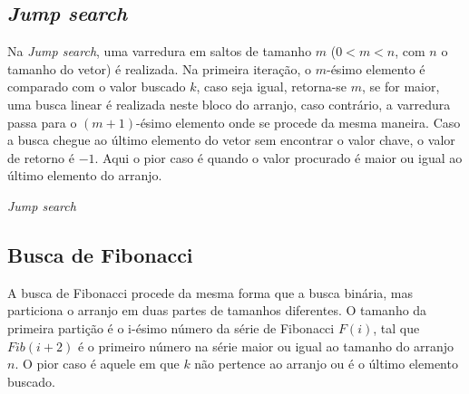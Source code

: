 \subsection{{\it Jump search}}

Na {\it Jump search}, uma varredura em saltos de tamanho $m$ ($0< m < n$, com $n$ o tamanho do vetor) é realizada. Na primeira iteração, o $m$-ésimo elemento é comparado com o valor buscado $k$, caso seja igual, retorna-se $m$, se for maior, uma busca linear é realizada neste bloco do arranjo, caso contrário, a varredura passa para o $(m+1)$-ésimo elemento onde se procede da mesma maneira. Caso a busca chegue ao último elemento do vetor sem encontrar o valor chave, o valor de retorno é $-1$. Aqui o pior caso é quando o valor procurado é maior ou igual ao último elemento do arranjo.

\begin{algorithm}[H]
  \DontPrintSemicolon
  \SetAlgoLined
  \caption{{\it Jump search}}

  \BlankLine

\end{algorithm}



\subsection{Busca de Fibonacci}

A busca de Fibonacci procede da mesma forma que a busca binária, mas particiona o arranjo em duas partes de tamanhos diferentes. O tamanho da primeira partição é o i-ésimo número da série de Fibonacci $F(i)$, tal que $Fib(i+2)$ é o primeiro número na série maior ou igual ao tamanho do arranjo $n$. O pior caso é aquele em que $k$ não pertence ao arranjo ou é o último elemento buscado. %

